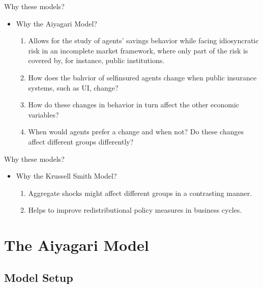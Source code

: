 \documentclass{beamer}
\begin{document}
\begin{frame}{Why these models?}
	\begin{itemize}
	
	\item {
	Why the Aiyagari Model? 
	}
	\begin{enumerate}
	\item {
Allows for the study of agents' savings behavior while facing idiosyncratic risk in an incomplete market framework, where only part of the risk is covered by, for instance, public institutions. 
	}
	\item {
How does the bahvior of selfinsured agents change when public insurance systems, such as UI, change? 
	}
	\item {
	How do these changes in behavior in turn affect the other economic variables?
	}
	\item {	
	When would agents prefer a change and when not? Do these changes affect different groups differently? 
	}	
	\end{enumerate}

	\end{itemize}

\end{frame}

\begin{frame}{Why these models?}
	\begin{itemize}
	
	\item {
	Why the Krussell Smith Model? 
	}
	
	\begin{enumerate}
	
	\item {
Aggregate shocks might affect different groups in a contrasting manner.  
	}
	\item {
Helps to improve redistributional policy measures in business cycles.
	}

	\end{enumerate}

	\end{itemize}

\end{frame}


\section{The Aiyagari Model}
\subsection{Model Setup}
\end{document}
